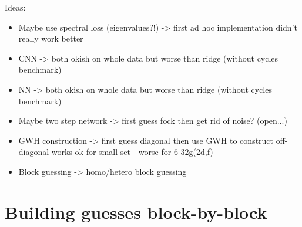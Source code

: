 Ideas: 
\begin{itemize}
    \item Maybe use spectral loss (eigenvalues?!) -> first ad hoc implementation didn't really work better
    \item CNN -> both okish on whole data but worse than ridge (without cycles benchmark) 
    \item NN  -> both okish on whole data but worse than ridge (without cycles benchmark)
    \item Maybe two step network -> first guess fock then get rid of noise? (open...)
    \item GWH construction -> first guess diagonal then use GWH to construct off-diagonal works ok for small set - worse for 6-32g(2d,f)
    \item Block guessing -> homo/hetero block guessing 
\end{itemize}


\section{Building guesses block-by-block}
\label{sec:blockwise_guessing}

